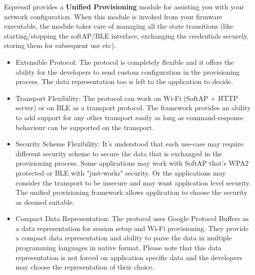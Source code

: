 \documentclass[main.tex]{subfiles}
\begin{document}
Espressif provides a \textbf{Unified Provisioning} module for assisting you with your network configuration. When this module is invoked from your firmware executable, the module takes care of managing all the state transitions (like starting/stopping the softAP/BLE interface, exchanging the credentials securely, storing them for subsequent use etc).

\begin{itemize}

\item Extensible Protocol: The protocol is completely flexible and it offers the ability for the developers to send custom configuration in the provisioning process. The data representation too is left to the application to decide.
\item Transport Flexibility: The protocol can work on Wi-Fi (SoftAP + HTTP server) or on BLE as a transport protocol. The framework provides an ability to add support for any other transport easily as long as command-response behaviour can be supported on the transport.
\item Security Scheme Flexibility: It’s understood that each use-case may require different security scheme to secure the data that is exchanged in the provisioning process. Some applications may work with SoftAP that’s WPA2 protected or BLE with "just-works" security. Or the applications may consider the transport to be insecure and may want application level security. The unified provisioning framework allows application to choose the security as deemed suitable.
\item Compact Data Representation: The protocol uses Google Protocol Buffers as a data representation for session setup and Wi-Fi provisioning. They provide a compact data representation and ability to parse the data in multiple programming languages in native format. Please note that this data representation is not forced on application specific data and the developers may choose the representation of their choice.

\end{itemize}
\end{document}
